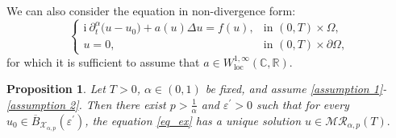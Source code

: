 \documentclass[reqno]{amsart}
\newtheorem{prop}[theorem]{Proposition}
\numberwithin{equation}{section}
\begin{document}
We can also consider the equation in non-divergence form:
\begin{equation*} 
\begin{cases} \mathrm{i}~\partial_t^\alpha \big(u-u_0\big) + a(u)\Delta u = f(u), & \text{in } (0,T)\times \Omega,\\ u = 0, & \text{in } (0,T)\times \partial \Omega, \end{cases} 
\end{equation*}
for which it is sufficient to assume that $a\in W^{1,\infty}_{\mbox{loc}}(\mathbb{C},\mathbb{R})$.

\begin{prop}
Let $T>0$, $\alpha\in (0,1)$ be fixed, and assume \eqref{assumption 1}-\eqref{assumption 2}. Then there exist $p>\frac{1}{\alpha}$ and $\varepsilon^\prime>0$ such that for every $u_0\in \overline{B}_{\mathcal{X}_{\alpha,p}}(\varepsilon^\prime)$,
the equation \eqref{eq_ex} has a unique solution $u\in \mathcal{M}\mathcal{R}_{\alpha,p}(T).$
\end{prop}
\end{document}
